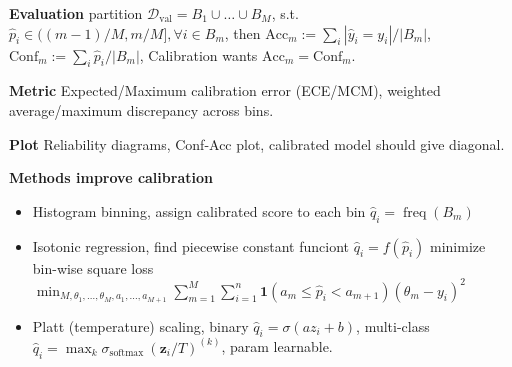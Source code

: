 \textbf{Evaluation} partition $\mathcal{D}_{\mathrm{val}}=B_1\cup \ldots \cup B_M$, s.t. $\hat{p}_i\in((m-1)/M, m/M], \forall i\in B_m$, then $\mathrm{Acc}_m:=\sum_{i}|\hat{y}_i = y_i|/|B_m|$, $\mathrm{Conf}_m:=\sum_i \hat{p}_i / |B_m|$, Calibration wants $\mathrm{Acc}_m = \mathrm{Conf}_m$.  

\textbf{Metric} Expected/Maximum calibration error (ECE/MCM),  weighted average/maximum discrepancy across bins.

\textbf{Plot} Reliability diagrams, Conf-Acc plot, calibrated model should give diagonal.

\textbf{Methods improve calibration}
\begin{itemize}  [itemsep=0pt,topsep=0pt, leftmargin=2pt, itemindent=5pt, labelwidth=5pt]
    \item Histogram binning, assign calibrated score to each bin $\hat{q}_i=\operatorname{freq}(B_m)$
    \item Isotonic regression, find piecewise constant funciont $\hat{q}_i=f(\hat{p}_i)$ minimize bin-wise square loss $\min _{M, \theta_1, \ldots, \theta_M, a_1, \ldots, a_{M+1}} \sum_{m=1}^M \sum_{i=1}^n \mathbf{1}(a_m \leq \hat{p}_i<a_{m+1})(\theta_m-y_i)^2$
    \item Platt (temperature) scaling, binary $\hat{q}_i=\sigma(a z_i+b)$, multi-class $\hat{q}_i=\max _k \sigma_{\text {softmax }}(\boldsymbol{z}_i / T)^{(k)}$, param learnable.
\end{itemize}